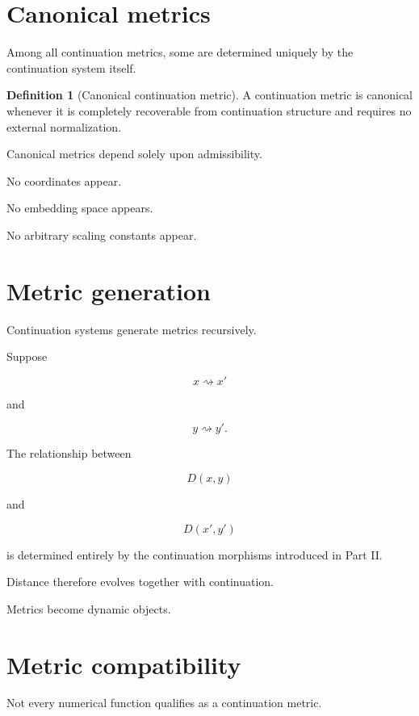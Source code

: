 \documentclass[13pt,openany]{book}
\theoremstyle{plain}
\theoremstyle{definition}
\newtheorem{definition}{Definition}[chapter]
\begin{document}
\section{Canonical metrics}

Among all continuation metrics, some are determined uniquely by the continuation system itself.

\begin{definition}[Canonical continuation metric]
A continuation metric is canonical whenever it is completely recoverable from continuation structure and requires no external normalization.
\end{definition}

Canonical metrics depend solely upon admissibility.

No coordinates appear.

No embedding space appears.

No arbitrary scaling constants appear.


\section{Metric generation}

Continuation systems generate metrics recursively.

Suppose

\[
x
\rightsquigarrow
x'
\]

and

\[
y
\rightsquigarrow
y'.
\]

The relationship between

\[
D(x,y)
\]

and

\[
D(x',y')
\]

is determined entirely by the continuation morphisms introduced in Part II.

Distance therefore evolves together with continuation.

Metrics become dynamic objects.


\section{Metric compatibility}

Not every numerical function qualifies as a continuation metric.
\end{document}
